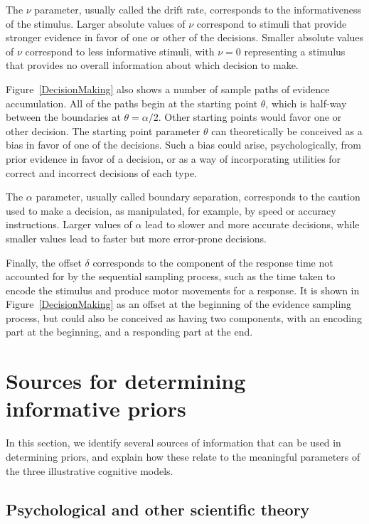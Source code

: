 The $\nu$ parameter, usually called the drift rate, corresponds to the informativeness of the stimulus. Larger absolute values of $\nu$ correspond to stimuli that provide stronger evidence in favor of one or other of the decisions. Smaller absolute values of $\nu$ correspond to less informative stimuli, with $\nu=0$ representing a stimulus that provides no overall information about which decision to make.
 
Figure~\ref{DecisionMaking} also shows a number of sample paths of evidence accumulation. All of the paths begin at the starting point $\theta$, which is half-way between the boundaries at $\theta = \alpha/2$. Other starting points would favor one or other decision. The starting point parameter $\theta$ can theoretically be conceived as a bias in favor of one of the decisions. Such a bias could arise, psychologically, from prior evidence in favor of a decision, or as a way of incorporating utilities for correct and incorrect decisions of each type.

The $\alpha$ parameter, usually called boundary separation, corresponds to the caution used to make a decision, as manipulated, for example, by speed or accuracy instructions. Larger values of $\alpha$ lead to slower and more accurate decisions, while smaller values lead to faster but more error-prone decisions.

Finally, the offset $\delta$ corresponds to the component of the response time not accounted for by the sequential sampling process, such as the time taken to encode the stimulus and produce motor movements for a response. It is shown in Figure~\ref{DecisionMaking} as an offset at the beginning of the evidence sampling process, but could also be conceived as having two components, with an encoding part at the beginning, and a responding part at the end.

\section{Sources for determining informative priors}

In this section, we identify several sources of information that can be used in determining priors, and explain how these relate to the meaningful parameters of the three illustrative cognitive models.

\subsection{Psychological and other scientific theory}

